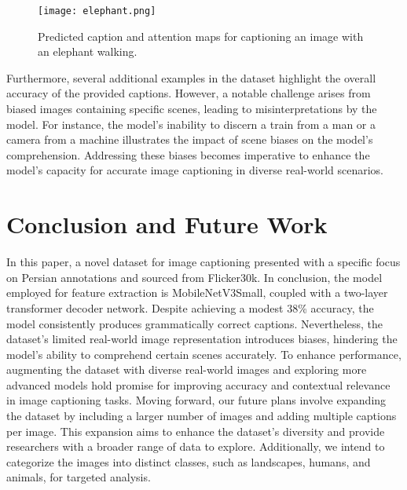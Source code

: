 \documentclass[runningheads]{llncs}
\begin{document}
\begin{figure}
  \texttt{[image: elephant.png]}
  \caption{ Predicted caption and attention maps for captioning an image with an elephant walking.} \label{fig5}
\end{figure}

Furthermore, several additional examples in the dataset highlight the overall accuracy of the provided captions. However, a notable challenge arises from biased images containing specific scenes, leading to misinterpretations by the model. For instance, the model's inability to discern a train from a man or a camera from a machine illustrates the impact of scene biases on the model's comprehension. Addressing these biases becomes imperative to enhance the model's capacity for accurate image captioning in diverse real-world scenarios.

\section{Conclusion and Future Work}
In this paper, a novel dataset for image captioning presented with a specific focus on Persian annotations and sourced from Flicker30k.
In conclusion, the model employed for feature extraction is MobileNetV3Small, coupled with a two-layer transformer decoder network. Despite achieving a modest 38\% accuracy, the model consistently produces grammatically correct captions. Nevertheless, the dataset's limited real-world image representation introduces biases, hindering the model's ability to comprehend certain scenes accurately. To enhance performance, augmenting the dataset with diverse real-world images and exploring more advanced models hold promise for improving accuracy and contextual relevance in image captioning tasks.
Moving forward, our future plans involve expanding the dataset by including a larger number of images and adding multiple captions per image. This expansion aims to enhance the dataset's diversity and provide researchers with a broader range of data to explore. Additionally, we intend to categorize the images into distinct classes, such as landscapes, humans, and animals, for targeted analysis.
\end{document}

